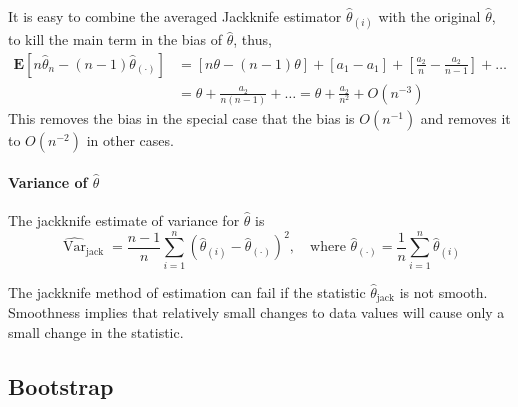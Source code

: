 \begin{remark}
	It is easy to combine the averaged Jackknife estimator $\hat{\theta}_{(i)}$ with the original $\hat{\theta}$, to kill the main term in the bias of $\hat{\theta}$, thus,
	\begin{equation}
		\begin{aligned}
			\mathbf{E}\left[n\hat{\theta}_{n}-(n-1)\hat{\theta}_{(\mathbf{\cdot})}\right] & =\left[n\theta-(n-1)\theta\right]+\left[a_{1}-a_{1}\right]+\left[\frac{a_{2}}{n}-\frac{a_{2}}{n-1}\right]+\ldots \\
			                                                                              & =\theta+\frac{a_{2}}{n(n-1)}+\ldots=\theta+\frac{a_{2}}{n^{2}}+O\left(n^{-3}\right)
		\end{aligned}
	\end{equation}
	This removes the bias in the special case that the bias is $O\left(n^{-1}\right)$ and removes it to $O\left(n^{-2}\right)$ in other cases.
\end{remark}

\paragraph{Variance of $\hat{\theta}$}

The jackknife estimate of variance for $\hat{\theta}$ is
\begin{equation}
	\widehat{\operatorname{Var}}_{\text{jack}}=\frac{n-1}{n}\sum_{i=1}^{n}\left(\hat{\theta}_{(i)}-\hat{\theta}_{(\cdot)}\right)^{2},\quad\text{where }\hat{\theta}_{(\cdot)}=\frac{1}{n}\sum_{i=1}^{n}\hat{\theta}_{(i)}
\end{equation}

The jackknife method of estimation can fail if the statistic $\hat{\theta}_{\text{jack}}$ is not smooth. Smoothness
implies that relatively small changes to data values will cause only a small change in the
statistic.

\begin{example}

\end{example}

\begin{example}

\end{example}

\subsection{Bootstrap}

